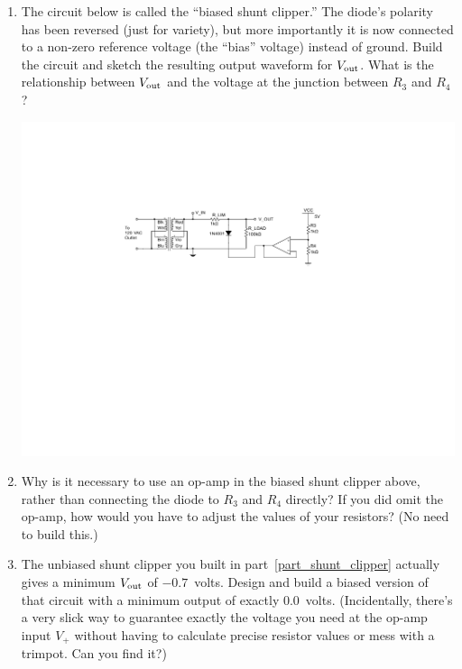 \begin{enumerate}[wide]
\item The circuit below is called the ``biased shunt clipper.''  The diode's polarity has been reversed (just for variety), but more importantly it is now connected to a non-zero reference voltage (the ``bias'' voltage) instead of ground.  Build the circuit and sketch the resulting output waveform for $V_{\rm out}$.  What is the relationship between $V_{\rm out}$ and the voltage at the junction between $R_3$ and $R_4$?  
\label{part_biased_shunt_clipper}
\begin{center}
\includegraphics{diodes/biased_shunt_clipper2.pdf}
\end{center} 

\item Why is it necessary to use an op-amp in the biased shunt clipper above, rather than connecting the diode to $R_3$ and $R_4$ directly?  If you did omit the op-amp, how would you have to adjust the values of your resistors? (No need to build this.)

\item The unbiased shunt clipper you built in part~\ref{part_shunt_clipper} actually gives a minimum $V_{\rm out}$ of $-0.7$~volts.  Design and build a biased version of that circuit with a minimum output of exactly $0.0$~volts.  (Incidentally, there's a very slick way to guarantee exactly the voltage you need at the op-amp input $V_+$ without having to calculate precise resistor values or mess with a trimpot.  Can you find it?)  \label{part_biased_clipper_zero}


\end{enumerate}
